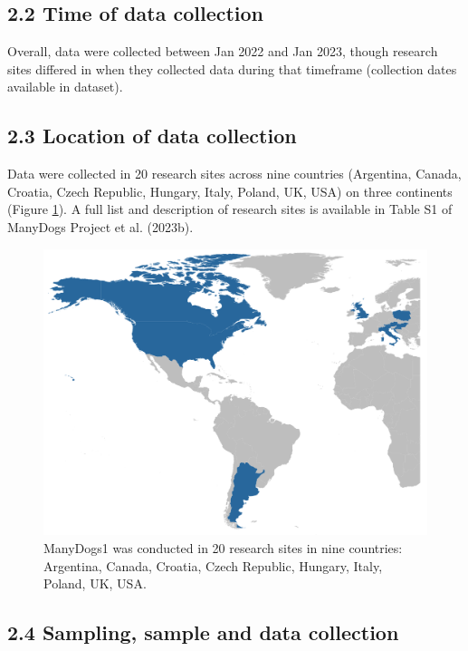 \documentclass[
  man,floatsintext]{apa6}
\begin{document}
\hypertarget{time-of-data-collection}{%
\subsection{2.2 Time of data collection}\label{time-of-data-collection}}

Overall, data were collected between Jan 2022 and Jan 2023, though research sites differed in when they collected data during that timeframe (collection dates available in dataset).

\hypertarget{location-of-data-collection}{%
\subsection{2.3 Location of data collection}\label{location-of-data-collection}}

Data were collected in 20 research sites across nine countries (Argentina, Canada, Croatia, Czech Republic, Hungary, Italy, Poland, UK, USA) on three continents (Figure \ref{fig:countries}). A full list and description of research sites is available in Table S1 of ManyDogs Project et al. (2023b).

\begin{figure}

{\centering \includegraphics[width=0.8\linewidth]{md1_countries} 

}

\caption{ManyDogs1 was conducted in 20 research sites in nine countries: Argentina, Canada, Croatia, Czech Republic, Hungary, Italy, Poland, UK, USA.}\label{fig:countries}
\end{figure}

\hypertarget{sampling-sample-and-data-collection}{%
\subsection{2.4 Sampling, sample and data collection}\label{sampling-sample-and-data-collection}}
\end{document}
